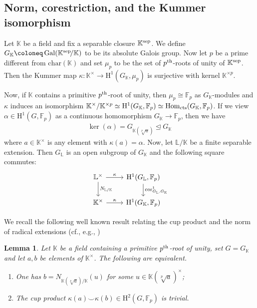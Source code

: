 \documentclass{amsart}
\newtheorem{lem}[thm]{Lemma}
\theoremstyle{definition}
\theoremstyle{remark}
\DeclareMathOperator{\Hom}{Hom}
\DeclareMathOperator{\Gal}{Gal}
\DeclareMathOperator{\cores}{cor}
\newcommand{\KK}{\mathbb{K}}
\newcommand{\LL}{\mathbb{L}}
\newcommand{\FF}{\mathbb{F}}
\newcommand{\rmH}{\mathrm H}%
\newcommand{\pth}{{p^{\rm th}}}
\begin{document}

\subsection{Norm, corestriction, and the Kummer isomorphism}
\label{ssec:Norm Corestriction and Kummer}
Let $\KK$ be a field and fix a separable closure $\KK^{\rm sep}$. We define $G_\KK\coloneq \Gal(\KK^{\rm sep}\!/\KK)$ to be its absolute Galois group. Now let $p$ be a prime different from $\mathrm{char}(\KK)$ and set $\mu_p$ to be the set of $\pth$-roots of unity of $\KK^{\rm sep}$. Then the Kummer map $\kappa:\KK^\times \to \rmH^1(G_\KK,\mu_p)$ is surjective with kernel $\KK^{\times p}$.

Now, if $\KK$ contains a primitive $\pth$-root of unity, then $\mu_p\cong \FF_p$ as $G_\KK$-modules and $\kappa$ induces an isomorphism $\KK^\times/\KK^{\times p}\simeq \rmH^1(G_{\KK},\FF_p)\simeq \Hom_{\rm cts}(G_\KK,\FF_p)$. If we view $\alpha\in \rmH^1(G,\FF_p)$ as a continuous homomorphism $G_\KK\to \FF_p$, then we have
\begin{align*}
    \ker(\alpha)=G_{\KK(\sqrt[p]{a})}\unlhd G_{\KK}
\end{align*}
where $a\in \KK^\times$ is any element with $\kappa(a)=\alpha$. Now, let $\LL/\KK$ be a finite separable extension. Then $G_{\LL}$ is an open subgroup of $G_\KK$ and the following square commutes:
\begin{equation}
\label{diag:cores square}
    \begin{tikzcd}
        \LL^\times \arrow[r,"\kappa"] \arrow[d,"{N_{\LL/\KK}}"]&\rmH^1(G_{\LL},\FF_p)\arrow[d,"{\cores^1_{G_\LL,G_\KK}}"]\\
        \KK^\times \arrow[r,"\kappa"] &\rmH^1(G_{\KK},\FF_p)
    \end{tikzcd}
\end{equation}


We recall the following well known result relating the cup product and the norm of radical extensions (cf., e.g., \cite[Cor.~4.7.7]{GilleSzamuely})

\begin{lem}\label{lem:norm and cup}
Let $\KK$ be a field containing a primitive $\pth$-root of unity, set $G=G_{\KK}$ and let $a,b$ be elements of $\KK^\times$.
The following are equivalent.
\begin{enumerate}[label=(\roman*)]
    \item One has $b=N_{\KK(\sqrt[p]{a})/\KK}(u)$ for some $u\in\KK(\sqrt[p]{a})^\times$;
    \item The cup product $\kappa(a)\smallsmile\kappa(b)\in\rmH^2(G,\FF_p)$ is trivial.
\end{enumerate}
\end{lem}
\end{document}
